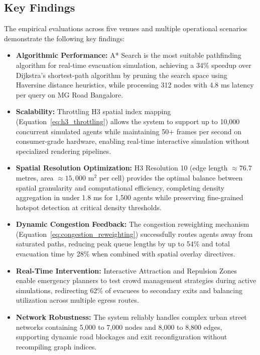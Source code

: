 \documentclass[12pt,a4paper,oneside]{report}
\begin{document}
\subsection{Key Findings}
The empirical evaluations across five venues and multiple operational scenarios demonstrate the following key findings:

\begin{itemize}
    \item \textbf{Algorithmic Performance:} A* Search is the most suitable pathfinding algorithm for real-time evacuation simulation, achieving a 34\% speedup over Dijkstra's shortest-path algorithm by pruning the search space using Haversine distance heuristics, while processing 312 nodes with 4.8 ms latency per query on MG Road Bangalore.
    
    \item \textbf{Scalability:} Throttling H3 spatial index mapping (Equation~\ref{eq:h3_throttling}) allows the system to support up to 10,000 concurrent simulated agents while maintaining 50+ frames per second on consumer-grade hardware, enabling real-time interactive simulation without specialized rendering pipelines.
    
    \item \textbf{Spatial Resolution Optimization:} H3 Resolution 10 (edge length $\approx 76.7$ metres, area $\approx 15,000$ m$^2$ per cell) provides the optimal balance between spatial granularity and computational efficiency, completing density aggregation in under 1.8 ms for 1,500 agents while preserving fine-grained hotspot detection at critical density thresholds.
    
    \item \textbf{Dynamic Congestion Feedback:} The congestion reweighting mechanism (Equation~\ref{eq:congestion_reweighting}) successfully routes agents away from saturated paths, reducing peak queue lengths by up to 54\% and total evacuation time by 28\% when combined with spatial overlay directives.
    
    \item \textbf{Real-Time Intervention:} Interactive Attraction and Repulsion Zones enable emergency planners to test crowd management strategies during active simulations, redirecting 62\% of evacuees to secondary exits and balancing utilization across multiple egress routes.
    
    \item \textbf{Network Robustness:} The system reliably handles complex urban street networks containing 5,000 to 7,000 nodes and 8,000 to 8,800 edges, supporting dynamic road blockages and exit reconfiguration without recompiling graph indices.
\end{itemize}
\end{document}
